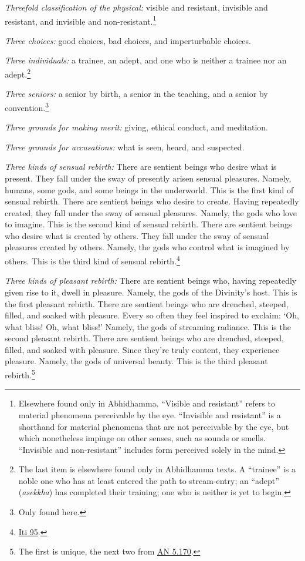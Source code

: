 \documentclass[12pt,openany]{book}%
\begin{document}
\emph{Threefold classification of the physical:} visible and resistant, invisible and resistant, and invisible and non-resistant.\footnote{Elsewhere found only in Abhidhamma. “Visible and resistant” refers to material phenomena perceivable by the eye. “Invisible and resistant” is a shorthand for material phenomena that are not perceivable by the eye, but which nonetheless impinge on other senses, such as sounds or smells. “Invisible and non-resistant” includes form perceived solely in the mind. } 

\emph{Three choices:} good choices, bad choices, and imperturbable choices. 

\emph{Three individuals:} a trainee, an adept, and one who is neither a trainee nor an adept.\footnote{The last item is elsewhere found only in Abhidhamma texts. A “trainee” is a noble one who has at least entered the path to stream-entry; an “adept” (\textit{asekkha}) has completed their training; one who is neither is yet to begin. } 

\emph{Three seniors:} a senior by birth, a senior in the teaching, and a senior by convention.\footnote{Only found here. } 

\emph{Three grounds for making merit:} giving, ethical conduct, and meditation. 

\emph{Three grounds for accusations:} what is seen, heard, and suspected. 

\emph{Three kinds of sensual rebirth:} There are sentient beings who desire what is present. They fall under the sway of presently arisen sensual pleasures. Namely, humans, some gods, and some beings in the underworld. This is the first kind of sensual rebirth. There are sentient beings who desire to create. Having repeatedly created, they fall under the sway of sensual pleasures. Namely, the gods who love to imagine. This is the second kind of sensual rebirth. There are sentient beings who desire what is created by others. They fall under the sway of sensual pleasures created by others. Namely, the gods who control what is imagined by others. This is the third kind of sensual rebirth.\footnote{\href{https://suttacentral.net/iti95/en/sujato}{Iti 95}. } 

\emph{Three kinds of pleasant rebirth:} There are sentient beings who, having repeatedly given rise to it, dwell in pleasure. Namely, the gods of the Divinity’s host. This is the first pleasant rebirth. There are sentient beings who are drenched, steeped, filled, and soaked with pleasure. Every so often they feel inspired to exclaim: ‘Oh, what bliss! Oh, what bliss!’ Namely, the gods of streaming radiance. This is the second pleasant rebirth. There are sentient beings who are drenched, steeped, filled, and soaked with pleasure. Since they’re truly content, they experience pleasure. Namely, the gods of universal beauty. This is the third pleasant rebirth.\footnote{The first is unique, the next two from \href{https://suttacentral.net/an5.170/en/sujato}{AN 5.170}. } 
\end{document}
